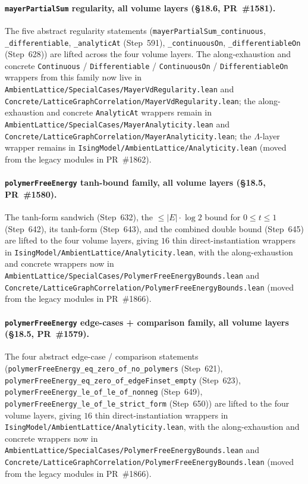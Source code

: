 \documentclass[a4paper,11pt]{article}
\begin{document}
\paragraph{\texttt{mayerPartialSum} regularity, all volume layers
(\S18.6, PR~\#1581).} The five abstract regularity statements
(\texttt{mayerPartialSum\_continuous},
\texttt{\_differentiable}, \texttt{\_analyticAt} (Step~591),
\texttt{\_continuousOn}, \texttt{\_differentiableOn} (Step~628))
are lifted across the four volume layers. The along-exhaustion
and concrete \texttt{Continuous} / \texttt{Differentiable} /
\texttt{ContinuousOn} / \texttt{DifferentiableOn} wrappers from this
family now live in
\texttt{AmbientLattice/SpecialCases/MayerVdRegularity.lean} and
\texttt{Concrete/LatticeGraphCorrelation/MayerVdRegularity.lean}; the
along-exhaustion and concrete \texttt{AnalyticAt} wrappers remain in
\texttt{AmbientLattice/SpecialCases/MayerAnalyticity.lean} and
\texttt{Concrete/LatticeGraphCorrelation/MayerAnalyticity.lean}; the
$\Lambda$-layer wrapper remains in
\texttt{IsingModel/AmbientLattice/Analyticity.lean}
(moved from the legacy modules in PR~\#1862).

\paragraph{\texttt{polymerFreeEnergy} tanh-bound family, all volume
layers (\S18.5, PR~\#1580).} The tanh-form sandwich (Step~632),
the $\le |E| \cdot \log 2$ bound for $0 \le t \le 1$ (Step~642),
its tanh-form (Step~643), and the combined double bound
(Step~645) are lifted to the four volume layers, giving $16$ thin
direct-instantiation wrappers in
\texttt{IsingModel/AmbientLattice/Analyticity.lean}, with the
along-exhaustion and concrete wrappers now in
\texttt{AmbientLattice/SpecialCases/PolymerFreeEnergyBounds.lean} and
\texttt{Concrete/LatticeGraphCorrelation/PolymerFreeEnergyBounds.lean}
(moved from the legacy modules in PR~\#1866).

\paragraph{\texttt{polymerFreeEnergy} edge-cases + comparison
family, all volume layers (\S18.5, PR~\#1579).} The four abstract
edge-case / comparison statements
(\texttt{polymerFreeEnergy\_eq\_zero\_of\_no\_polymers} (Step~621),
\texttt{polymerFreeEnergy\_eq\_zero\_of\_edgeFinset\_empty}
(Step~623),
\texttt{polymerFreeEnergy\_le\_of\_le\_of\_nonneg} (Step~649),
\texttt{polymerFreeEnergy\_le\_of\_le\_strict\_form} (Step~650))
are lifted to the four volume layers, giving $16$ thin
direct-instantiation wrappers in
\texttt{IsingModel/AmbientLattice/Analyticity.lean}, with the
along-exhaustion and concrete wrappers now in
\texttt{AmbientLattice/SpecialCases/PolymerFreeEnergyBounds.lean} and
\texttt{Concrete/LatticeGraphCorrelation/PolymerFreeEnergyBounds.lean}
(moved from the legacy modules in PR~\#1866).
\end{document}

